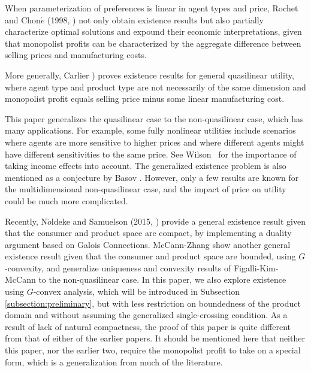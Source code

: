 \documentclass[a4paper, 11pt]{amsart}
\numberwithin{equation}{section}
\theoremstyle{plain}
\theoremstyle{definition}
\theoremstyle{remark}
\begin{document}
When parameterization of preferences is linear in agent types and price, Rochet and Chon$\acute{e}$ (1998, \cite{RochetChone98}) not only obtain existence results but also partially characterize optimal solutions and expound their economic interpretations, %
given that monopolist profits can be characterized by {the aggregate difference between selling prices and manufacturing costs.}\medskip

More generally, Carlier \cite{Carlier01}) proves existence results for general quasilinear utility, where agent type and product type are not necessarily of the same dimension and monopolist profit equals selling price minus some linear manufacturing cost.\medskip

This paper generalizes the quasilinear case to the non-quasilinear case, which has many applications. For example, some fully nonlinear utilities include scenarios where agents are more sensitive to higher prices and where different agents might have different sensitivities to the same price. %
See Wilson~\cite[Chapter 7]{Wilson93} for the importance of taking income effects into account. 
The generalized existence problem is also mentioned as a conjecture by Basov \cite[Chapter~8]{Basov05}. However, only a few results are known for the multidimensional non-quasilinear case, and the impact of price on utility could be much more complicated.\medskip


Recently, N$\ddot{o}$ldeke and Samuelson (2015, \cite{NoldekeSamuelson15p}) provide a general existence result given that the consumer and product space are compact, by implementing a duality argument based on Galois Connections. McCann-Zhang \cite{McCannZhang17} show another general existence result given that the consumer and product space are bounded, using $G$-convexity, and generalize uniqueness and convexity results of Figalli-Kim-McCann \cite{FigalliKimMcCann11} to the non-quasilinear case. In this paper, we also explore existence using $G$-convex analysis, which will be introduced in Subsection \ref{subsection:preliminary}, but with less restriction on boundedness of the product domain and without assuming the generalized single-crossing condition. As a result of lack of natural compactness, the proof of this paper is quite different from that of either of the %
 earlier papers. It should be mentioned here that {neither} this paper, %
{nor the earlier two}, %
require the monopolist profit to take on a special form, which is a generalization from much of the literature.\medskip
\end{document}
